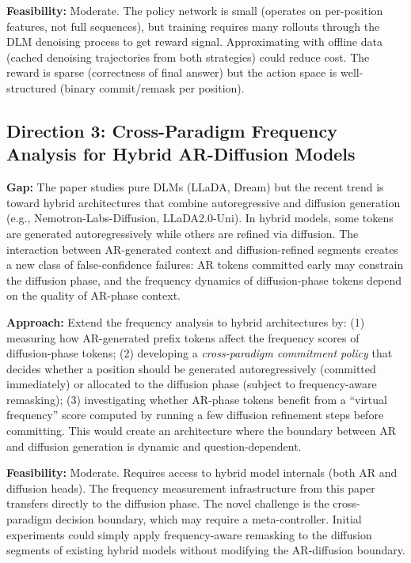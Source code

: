 \documentclass[11pt,a4paper]{article}
\begin{document}
\textbf{Feasibility:} Moderate. The policy network is small (operates on per-position features, not full sequences), but training requires many rollouts through the DLM denoising process to get reward signal. Approximating with offline data (cached denoising trajectories from both strategies) could reduce cost. The reward is sparse (correctness of final answer) but the action space is well-structured (binary commit/remask per position).

\subsection{Direction 3: Cross-Paradigm Frequency Analysis for Hybrid AR-Diffusion Models}
\textbf{Gap:} The paper studies pure DLMs (LLaDA, Dream) but the recent trend is toward hybrid architectures that combine autoregressive and diffusion generation (e.g., Nemotron-Labs-Diffusion, LLaDA2.0-Uni). In hybrid models, some tokens are generated autoregressively while others are refined via diffusion. The interaction between AR-generated context and diffusion-refined segments creates a new class of false-confidence failures: AR tokens committed early may constrain the diffusion phase, and the frequency dynamics of diffusion-phase tokens depend on the quality of AR-phase context.

\textbf{Approach:} Extend the frequency analysis to hybrid architectures by: (1) measuring how AR-generated prefix tokens affect the frequency scores of diffusion-phase tokens; (2) developing a \emph{cross-paradigm commitment policy} that decides whether a position should be generated autoregressively (committed immediately) or allocated to the diffusion phase (subject to frequency-aware remasking); (3) investigating whether AR-phase tokens benefit from a ``virtual frequency'' score computed by running a few diffusion refinement steps before committing. This would create an architecture where the boundary between AR and diffusion generation is dynamic and question-dependent.

\textbf{Feasibility:} Moderate. Requires access to hybrid model internals (both AR and diffusion heads). The frequency measurement infrastructure from this paper transfers directly to the diffusion phase. The novel challenge is the cross-paradigm decision boundary, which may require a meta-controller. Initial experiments could simply apply frequency-aware remasking to the diffusion segments of existing hybrid models without modifying the AR-diffusion boundary.
\end{document}
